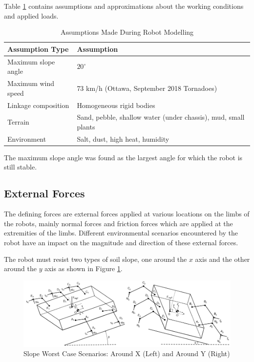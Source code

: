 Table \ref{tab:assumptions} contains assumptions and approximations about the working conditions and applied loads.
\begin{table}[H]
    \centering
    \caption{Assumptions Made During Robot Modelling}
    \label{tab:assumptions}
    \begin{tabular}{l l}
        \\ \hline
        \textbf{Assumption Type} & \textbf{Assumption} 
        \\ \hline
        Maximum slope angle & $20^{\circ}$
        \\
        Maximum wind speed & 73 km/h (Ottawa, September 2018 Tornadoes)
        \\
        Linkage composition & Homogeneous rigid bodies
        \\
        Terrain & Sand, pebble, shallow water (under chassis), mud, small plants
        \\
        Environment & Salt, dust, high heat, humidity
        \\ \hline
    \end{tabular}
\end{table}

The maximum slope angle was found as the largest angle for which the robot is still stable.


\subsection{External Forces} \label{sec:modelling_slope}
The defining forces are external forces applied at various locations on the limbs of the robots, mainly normal forces and friction forces which are applied at the extremities of the limbs. Different environmental scenarios encountered by the robot have an impact on the magnitude and direction of these external forces. 

The robot must resist two types of soil slope, one around the $x$ axis and the other around the $y$ axis as shown in Figure \ref{fig:mod_Slope_XY}.

\begin{figure}
    \centering
    \includegraphics[width=\textwidth]{3_SystemModelling/img/Slope_XY.PNG}
    \caption{Slope Worst Case Scenarios: Around X (Left) and Around Y (Right)}
    \label{fig:mod_Slope_XY}
\end{figure}

